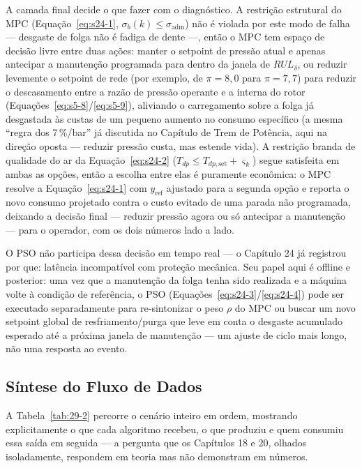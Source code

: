 \documentclass[12pt,a4paper]{article}
\numberwithin{equation}{section}
\numberwithin{table}{section}
\numberwithin{figure}{section}
\begin{document}
{A camada final decide o que fazer com o diagnóstico. A restrição estrutural do MPC (Equação~\eqref{eq:s24-1}, $\sigma_b(k) \le \sigma_{\text{adm}}$) não é violada por este modo de falha — desgaste de folga não é fadiga de dente —, então o MPC tem espaço de decisão livre entre duas ações: manter o setpoint de pressão atual e apenas antecipar a manutenção programada para dentro da janela de $RUL_\delta$, ou reduzir levemente o setpoint de rede (por exemplo, de $\pi = 8{,}0$ para $\pi = 7{,}7$) para reduzir o descasamento entre a razão de pressão operante e a interna do rotor (Equações~\eqref{eq:s5-8}/\eqref{eq:s5-9}), aliviando o carregamento sobre a folga já desgastada às custas de um pequeno aumento no consumo específico (a mesma ``regra dos 7\,\%/bar'' já discutida no Capítulo de Trem de Potência, aqui na direção oposta — reduzir pressão custa, mas estende vida). A restrição branda de qualidade do ar da Equação~\eqref{eq:s24-2} ($T_{dp} \le T_{dp,\text{set}} + \varsigma_k$) segue satisfeita em ambas as opções, então a escolha entre elas é puramente econômica: o MPC resolve a Equação~\eqref{eq:s24-1} com $y_{\text{ref}}$ ajustado para a segunda opção e reporta o novo consumo projetado contra o custo evitado de uma parada não programada, deixando a decisão final — reduzir pressão agora ou só antecipar a manutenção — para o operador, com os dois números lado a lado.

O PSO não participa dessa decisão em tempo real — o Capítulo 24 já registrou por que: latência incompatível com proteção mecânica. Seu papel aqui é offline e posterior: uma vez que a manutenção da folga tenha sido realizada e a máquina volte à condição de referência, o PSO (Equações~\eqref{eq:s24-3}/\eqref{eq:s24-4}) pode ser executado separadamente para re-sintonizar o peso $\rho$ do MPC ou buscar um novo setpoint global de resfriamento/purga que leve em conta o desgaste acumulado esperado até a próxima janela de manutenção — um ajuste de ciclo mais longo, não uma resposta ao evento.

\subsection{Síntese do Fluxo de Dados}

A Tabela~\ref{tab:29-2} percorre o cenário inteiro em ordem, mostrando explicitamente o que cada algoritmo recebeu, o que produziu e quem consumiu essa saída em seguida — a pergunta que os Capítulos 18 e 20, olhados isoladamente, respondem em teoria mas não demonstram em números.

}
\end{document}
